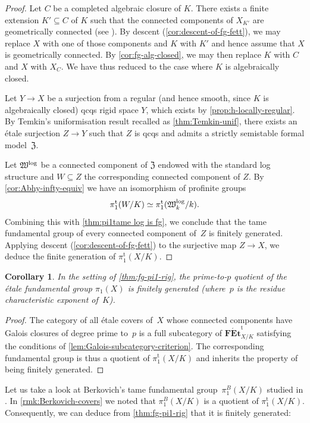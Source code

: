 \documentclass[a4paper,twoside,11pt,reqno]{amsart}
\newcommand{\fW}{{\mathfrak{W}}}
\newcommand{\fZ}{{\mathfrak{Z}}}
\newcommand{\cat}[1]{\mathbf{#1}}
\newcommand{\pitame}{\pi_1^{\mathrm{t}}}
\newcommand{\FEtt}{{\cat{F\acute{E}t}}^{\!\mathrm{t}}}
\newtheorem{cor}[thm]{Corollary}
\theoremstyle{definition}
\numberwithin{equation}{subsection}
\begin{document}
\begin{proof} 
Let $C$ be a completed algebraic closure of $K$. There exists a finite extension $K'\subseteq C$ of $K$ such that the connected components of $X_{K'}$ are geometrically connected (see \cite[Corollary 3.2.3]{Conrad:IrreducibleComponents}). By descent (\cref{cor:descent-of-fg-fett}), we may replace $X$ with one of those components and $K$ with $K'$ and hence assume that $X$ is geometrically connected. By \cref{cor:fg-alg-closed}, we may then replace $K$ with $C$ and $X$ with $X_C$. We have thus reduced to the case where $K$ is algebraically closed. 
   
Let $Y\to X$ be a surjection from a regular (and hence smooth, since $K$ is algebraically closed) qcqs rigid space $Y$, which exists by \cref{prop:h-locally-regular}. By Temkin's uniformisation result recalled as \cref{thm:Temkin-unif}, there exists an \'etale surjection $Z\to Y$ such that $Z$ is qcqs and admits a strictly semistable formal model~$\fZ$.

Let $\fW^{\rm log}$ be a connected component of $\fZ$ endowed with the standard log structure and $W\subseteq Z$ the corresponding connected component of $Z$. By \cref{cor:Abhy-infty-equiv} we have an isomorphism of profinite groups
\[ 
    \pitame(W/K) \simeq \pitame(\fW^{\rm log}_k/k).
\]
Combining this with \cref{thm:pi1tame log is fg}, we conclude that the tame fundamental group of every connected component of~$Z$ is finitely generated. Applying descent (\cref{cor:descent-of-fg-fett}) to the surjective map $Z\to X$, we deduce the finite generation of $\pitame(X/K)$.
\end{proof}

\begin{cor}
    In the setting of \cref{thm:fg-pi1-rig}, the prime-to-$p$ quotient of the étale fundamental group $\pi_1(X)$ is finitely generated (where~$p$ is the residue characteristic exponent of~$K$).
\end{cor}

\begin{proof}
The category of all étale covers of~$X$ whose connected components have Galois closures of degree prime to~$p$ is a full subcategory of $\FEtt_{X/K}$ satisfying the conditions of \cref{lem:Galois-subcategory-criterion}.
The corresponding fundamental group is thus a quotient of $\pitame(X/K)$ and inherits the property of being finitely generated.
\end{proof}

Let us take a look at Berkovich's tame fundamental group~$\pi_1^B(X/K)$ studied in \cite[\S6.3]{Berkovich:EtaleCohomology}.
In \cref{rmk:Berkovich-covers} we noted that $\pi_1^B(X/K)$ is a quotient of $\pitame(X/K)$.
Consequently, we can deduce from \cref{thm:fg-pi1-rig} that it is finitely generated:
\end{document}
